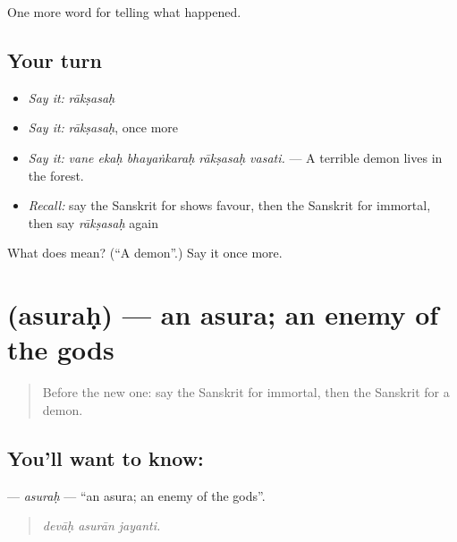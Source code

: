 \begin{grammarlens}[title={What you've built}]
One more word for telling what happened.
\end{grammarlens}

\subsection*{Your turn}
\begin{itemize}
\raggedright
  \item \emph{Say it:} \emph{rākṣasaḥ}
  \item \emph{Say it:} \emph{rākṣasaḥ}, once more
  \item \emph{Say it:} \emph{vane ekaḥ bhayaṅkaraḥ rākṣasaḥ vasati.} — A terrible demon lives in the forest.
  \item \emph{Recall:} say the Sanskrit for shows favour, then the Sanskrit for immortal, then say \emph{rākṣasaḥ} again
\end{itemize}

\begin{tcolorbox}[breakable,colback=teal!4,colframe=teal!35!black,title={Before you move on}]
What does  mean? (\textquotedblleft{}A demon\textquotedblright{}.) Say it once more.
\end{tcolorbox}
\section[\texorpdfstring{\sk{असुरः} (asuraḥ)}{असुरः (asuraḥ)}]{ (asuraḥ) — an asura; an enemy of the gods}

\label{lesson:SA-C334-asurah}



\begin{quote}
Before the new one: say the Sanskrit for immortal, then the Sanskrit for a demon.
\end{quote}

\subsection*{You'll want to know: }
\textbf{} — \emph{asuraḥ} — \textquotedblleft{}an asura; an enemy of the gods\textquotedblright{}.

\begin{quote}
  
\end{quote}

\begin{quote}
\emph{devāḥ asurān jayanti.}
\end{quote}

